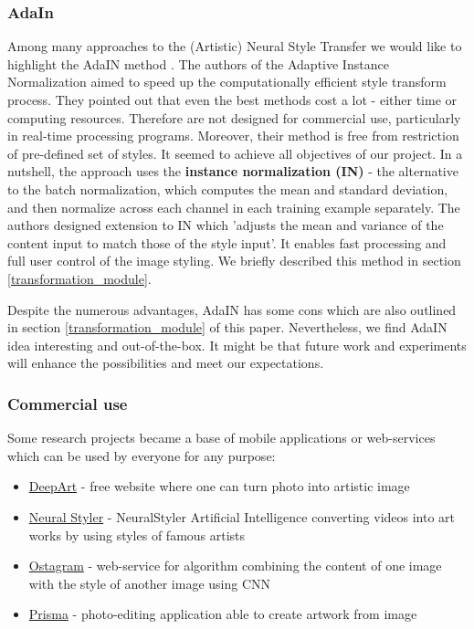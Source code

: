 \documentclass[../Main.tex]{subfiles}
\begin{document}
    \subsubsection{AdaIn}
    Among many approaches to the (Artistic) Neural Style Transfer we would like to highlight the AdaIN method \cite{huang2017adain}. The authors of the Adaptive Instance Normalization aimed to speed up the computationally efficient style transform process. They pointed out that even the best methods cost a lot - either time or computing resources. Therefore are not designed for commercial use, particularly in real-time processing programs. Moreover, their method is free from restriction of pre-defined set of styles. It seemed to achieve all objectives of our project. In a nutshell, the approach uses the \textbf{instance normalization (IN)} - the alternative to the batch normalization, which computes the mean and standard deviation, and then normalize across each channel in each training example separately. The authors designed extension to IN which 'adjusts the mean and variance of the
    content input to match those of the style input'. It enables fast processing and full user control of the image styling. We briefly described this method in section \ref{transformation_module}.
    
    Despite the numerous advantages, AdaIN has some cons which are also outlined in section \ref{transformation_module} of this paper. Nevertheless, we find AdaIN idea interesting and out-of-the-box. It might be that future work and experiments will enhance the possibilities and meet our expectations.

    \subsubsection{Commercial use}
    Some research projects became a base of mobile applications or web-services which can be used by everyone for any purpose:
    \begin{itemize}
        \item \href{https://deepart.io}{DeepArt} - free website where one can turn photo into artistic image
        \item \href{http://neuralstyler.com}{Neural Styler} - NeuralStyler Artificial Intelligence converting videos into art works by using styles of famous artists
        \item \href{https://www.ostagram.me/static_pages/lenta?last_days=1000&locale=en}{Ostagram} - web-service for algorithm combining the content of one image with the style of another image using CNN
        \item \href{https://prisma-ai.com}{Prisma} - photo-editing application able to create artwork from image
    \end{itemize}
\end{document}
